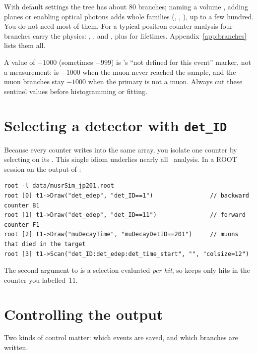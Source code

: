 \begin{keypoint}
With default settings the tree has about 80 branches; naming a volume , adding  planes or enabling optical photons adds whole families (, , ), up to a few hundred. You do not need most of them. For a typical positron-counter analysis four branches carry the physics: , ,  and , plus  for lifetimes. Appendix~\ref{app:branches} lists them all.
\end{keypoint}

\begin{pitfall}
A value of \(-1000\) (sometimes \(-999\)) is \musrSim's ``not defined for this event'' marker, not a measurement:  is \(-1000\) when the muon never reached the sample, and the muon branches stay \(-1000\) when the primary is not a muon. Always cut these sentinel values before histogramming or fitting.
\end{pitfall}

\section{Selecting a detector with \texttt{det\_ID}}
Because every counter writes into the same  array, you isolate one counter by selecting on its . This single idiom underlies nearly all \musrSim\ analysis. In a ROOT session on the output of :

\begin{lstlisting}[style=cpp,caption={Per-detector spectra in ROOT, selected by \texttt{det\_ID}}]
root -l data/musrSim_jp201.root
root [0] t1->Draw("det_edep", "det_ID==1")                // backward counter B1
root [1] t1->Draw("det_edep", "det_ID==11")               // forward counter F1
root [2] t1->Draw("muDecayTime", "muDecayDetID==201")     // muons that died in the target
root [3] t1->Scan("det_ID:det_edep:det_time_start", "", "colsize=12")
\end{lstlisting}

The second argument to  is a selection evaluated \emph{per hit}, so  keeps only hits in the counter you labelled~11.

\section{Controlling the output}
Two kinds of control matter: which events are saved, and which branches are written.

